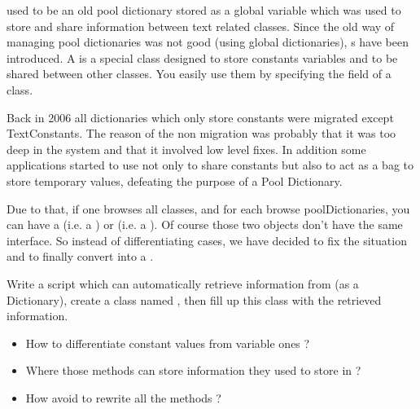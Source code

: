  used to be an old pool dictionary stored as a global variable which was used to store and share information between text related classes. Since the old way of managing pool dictionaries was not good (using global dictionaries), s have been introduced. A  is a special class designed to store constants variables and to be shared between other classes. You easily use them by specifying the  field of a class.

Back in 2006 all dictionaries which only store constants were migrated except TextConstants. The reason of the non migration was probably that it was too deep in the system and that it involved low level fixes.  In addition some applications started to use  not only to share constants but also to act as a bag to store temporary values, defeating the purpose of a Pool Dictionary. 

Due to that, if one browses all classes, and for each browse poolDictionaries, you can have a  (i.e. a ) or  (i.e. a ). Of course those two objects don't have the same interface. So instead of differentiating cases, we have decided to fix the situation and to finally convert  into a .

\goal
Write a script which can automatically retrieve information from  (as a Dictionary), create a  class named , then fill up this class with the retrieved information.

\problems
\begin{itemize}
	\item How to differentiate constant values from variable ones ?
	\item Where those methods can store information they used to store in  ?
	\item How avoid to rewrite all the methods ?
\end{itemize}

